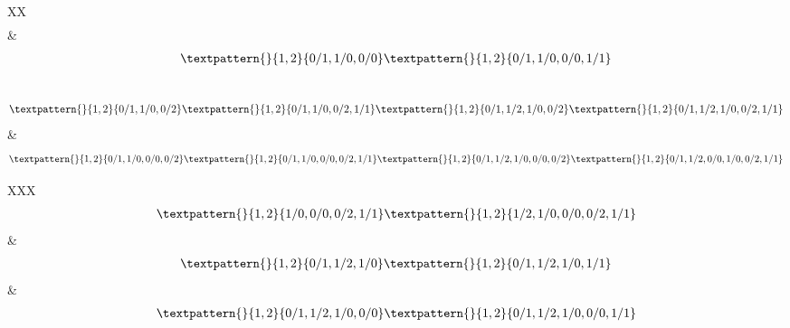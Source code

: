 \begin{center}
\begin{longtabu}[l]{XX}
\begin{equation}
\begin{gathered}
	\end{gathered}
	\label{cls:2}
\end{equation}
    &
\begin{equation}
	\begin{gathered}
		\textpattern{}{1,2}{0/1,1/0,0/0}
		\textpattern{}{1,2}{0/1,1/0,0/0,1/1}
	\end{gathered}
	\label{cls:3}
\end{equation}\\
\begin{equation}
	\begin{gathered}
		\textpattern{}{1,2}{0/1,1/0,0/2}
		\textpattern{}{1,2}{0/1,1/0,0/2,1/1}
		\textpattern{}{1,2}{0/1,1/2,1/0,0/2}
		\textpattern{}{1,2}{0/1,1/2,1/0,0/2,1/1}
	\end{gathered}
	\label{cls:4}
\end{equation}
    &
\begin{equation}
	\begin{gathered}
		\textpattern{}{1,2}{0/1,1/0,0/0,0/2}
		\textpattern{}{1,2}{0/1,1/0,0/0,0/2,1/1}
		\textpattern{}{1,2}{0/1,1/2,1/0,0/0,0/2}
		\textpattern{}{1,2}{0/1,1/2,0/0,1/0,0/2,1/1}
	\end{gathered}
	\label{cls:5}
\end{equation}
\end{longtabu}

\noindent\begin{longtabu}[l]{XXX}
\begin{equation}
	\begin{gathered}
		\textpattern{}{1,2}{1/0,0/0,0/2,1/1}
		\textpattern{}{1,2}{1/2,1/0,0/0,0/2,1/1}
	\end{gathered}
	\label{cls:6}
\end{equation}
    &
\begin{equation}
	\begin{gathered}
		\textpattern{}{1,2}{0/1,1/2,1/0}
		\textpattern{}{1,2}{0/1,1/2,1/0,1/1}
	\end{gathered}
	\label{cls:7}
\end{equation}
    &
\begin{equation}
	\begin{gathered}
		\textpattern{}{1,2}{0/1,1/2,1/0,0/0}
		\textpattern{}{1,2}{0/1,1/2,1/0,0/0,1/1}
	\end{gathered}
	\label{cls:8}
\end{equation}
\end{longtabu}


\end{center}
